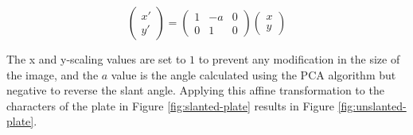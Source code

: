\begin{equation}
    \begin{pmatrix}
        x' \\
        y'
    \end{pmatrix}
    =
    \begin{pmatrix}
        1 & -a & 0 \\
        0 & 1 & 0
    \end{pmatrix}
    \begin{pmatrix}
        x \\
        y
    \end{pmatrix}
    \label{eq:shear-matrix}
\end{equation}

The x and y-scaling values are set to $1$ to prevent any modification in the size of the image, and the $a$ value is the angle calculated using the PCA algorithm but negative to reverse the slant angle. Applying this affine transformation to the characters of the plate in Figure \ref{fig:slanted-plate} results in Figure \ref{fig:unslanted-plate}.


